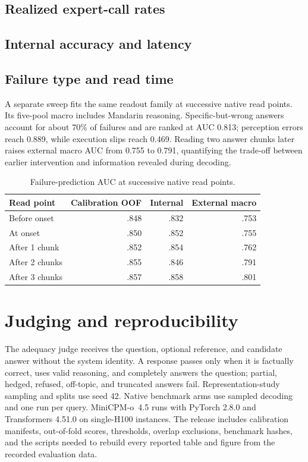 \subsection{Realized expert-call rates}
\label{app:transferdetail}


\clearpage
\subsection{Internal accuracy and latency}



\subsection{Failure type and read time}
\label{app:readtime}
A separate sweep fits the same readout family at successive native read points.
Its five-pool macro includes Mandarin reasoning. Specific-but-wrong answers
account for about 70\% of failures and are ranked at AUC 0.813; perception
errors reach 0.889, while execution slips reach 0.469. Reading two answer chunks
later raises external macro AUC from 0.755 to 0.791, quantifying the trade-off
between earlier intervention and information revealed during decoding.

\begin{table}[h]
\centering\small
\caption{Failure-prediction AUC at successive native read points.}
\label{tab:readtime}
\begin{tabular}{lrrr}
\toprule
Read point & Calibration OOF & Internal & External macro \\
\midrule
Before onset & .848 & .832 & .753 \\
At onset & .850 & .852 & .755 \\
After 1 chunk & .852 & .854 & .762 \\
After 2 chunks & .855 & .846 & .791 \\
After 3 chunks & .857 & .858 & .801 \\
\bottomrule
\end{tabular}
\end{table}

\section{Judging and reproducibility}
\label{app:prompts}
\label{app:repro}
The adequacy judge receives the question, optional reference, and candidate
answer without the system identity. A response passes only when it is factually
correct, uses valid reasoning, and completely answers the question; partial,
hedged, refused, off-topic, and truncated answers fail. Representation-study
sampling and splits use seed 42. Native benchmark arms use sampled decoding and
one run per query. MiniCPM-o~4.5 runs with PyTorch 2.8.0 and Transformers 4.51.0
on single-H100 instances. The release includes calibration manifests,
out-of-fold scores, thresholds, overlap exclusions, benchmark hashes, and the
scripts needed to rebuild every reported table and figure from the recorded
evaluation data.
